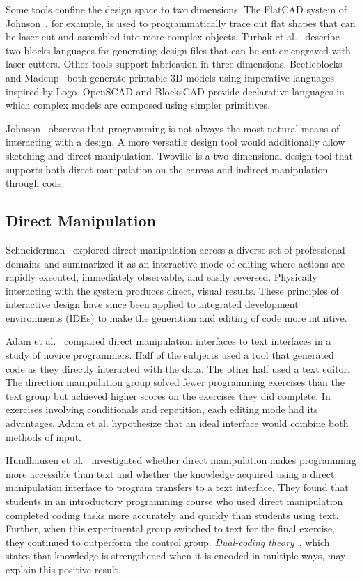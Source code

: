 Some tools confine the design space to two dimensions. The FlatCAD system of Johnson~\cite{johnson08flat}, for example, is used to programmatically trace out flat shapes that can be laser-cut and assembled into more complex objects. Turbak et al.~\cite{turbak12tangible} describe two blocks languages for generating design files that can be cut or engraved with laser cutters. Other tools support fabrication in three dimensions. Beetleblocks~\cite{koschitz12exploring} and Madeup~\cite{johnson17toward} both generate printable 3D models using imperative languages inspired by Logo. OpenSCAD and BlocksCAD provide declarative languages in which complex models are composed using simpler primitives.

Johnson~\cite{johnson08flat} observes that programming is not always the most natural means of interacting with a design. A more versatile design tool would additionally allow sketching and direct manipulation. Twoville is a two-dimensional design tool that supports both direct manipulation on the canvas and indirect manipulation through code.

\subsection{Direct Manipulation}
Schneiderman~\cite{shneiderman19931} explored direct manipulation across a diverse set of professional domains and summarized it as an interactive mode of editing where actions are rapidly executed, immediately observable, and easily reversed. Physically interacting with the system produces direct, visual results. These principles of interactive design have since been applied to integrated development environments (IDEs) to make the generation and editing of code more intuitive.

Adam et al.~\cite{adam19dm} compared direct manipulation interfaces to text interfaces in a study of novice programmers. Half of the subjects used a tool that generated code as they directly interacted with the data. The other half used a text editor. The direction manipulation group solved fewer programming exercises than the text group but achieved higher scores on the exercises they did complete. In exercises involving conditionals and repetition, each editing mode had its advantages. Adam et al. hypothesize that an ideal interface would combine both methods of input.

Hundhausen et al.~\cite{hundhausen09dm} investigated whether direct manipulation makes programming more accessible than text and whether the knowledge acquired using a direct manipulation interface to program transfers to a text interface. They found that students in an introductory programming course who used direct manipulation completed coding tasks more accurately and quickly than students using text. Further, when this experimental group switched to text for the final exercise, they continued to outperform the control group. \textit{Dual-coding theory}~\cite{clark1991dual}, which states that knowledge is strengthened when it is encoded in multiple ways, may explain this positive result.


